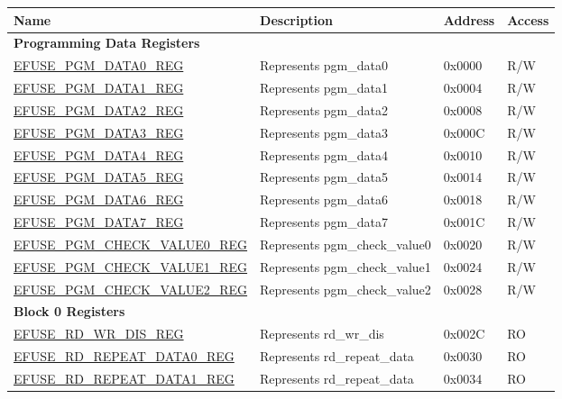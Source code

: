 \begin{longtable}{ | p{7cm} | p{6cm} | p{1.2cm} | p{1.5cm} | }
\hline\rowcolor{lightgray}
Name & Description &  Address & Access \\ \hline
\endhead
\multicolumn{4}{|l|}{\textbf{Programming Data Registers}} \\ \hline
\hyperref[regdesc:EFUSEPGMDATANREG]{EFUSE\_PGM\_DATA0\_REG} & Represents pgm\_data0 & 0x0000 & R/W \\ \hline
\hyperref[regdesc:EFUSEPGMDATANREG]{EFUSE\_PGM\_DATA1\_REG} & Represents pgm\_data1 & 0x0004 & R/W \\ \hline
\hyperref[regdesc:EFUSEPGMDATANREG]{EFUSE\_PGM\_DATA2\_REG} & Represents pgm\_data2 & 0x0008 & R/W \\ \hline
\hyperref[regdesc:EFUSEPGMDATANREG]{EFUSE\_PGM\_DATA3\_REG} & Represents pgm\_data3 & 0x000C & R/W \\ \hline
\hyperref[regdesc:EFUSEPGMDATANREG]{EFUSE\_PGM\_DATA4\_REG} & Represents pgm\_data4 & 0x0010 & R/W \\ \hline
\hyperref[regdesc:EFUSEPGMDATANREG]{EFUSE\_PGM\_DATA5\_REG} & Represents pgm\_data5 & 0x0014 & R/W \\ \hline
\hyperref[regdesc:EFUSEPGMDATANREG]{EFUSE\_PGM\_DATA6\_REG} & Represents pgm\_data6 & 0x0018 & R/W \\ \hline
\hyperref[regdesc:EFUSEPGMDATANREG]{EFUSE\_PGM\_DATA7\_REG} & Represents pgm\_data7 & 0x001C & R/W \\ \hline
\hyperref[regdesc:EFUSEPGMCHECKVALUENREG]{EFUSE\_PGM\_CHECK\_VALUE0\_REG} & Represents pgm\_check\_value0 & 0x0020 & R/W \\ \hline
\hyperref[regdesc:EFUSEPGMCHECKVALUENREG]{EFUSE\_PGM\_CHECK\_VALUE1\_REG} & Represents pgm\_check\_value1 & 0x0024 & R/W \\ \hline
\hyperref[regdesc:EFUSEPGMCHECKVALUENREG]{EFUSE\_PGM\_CHECK\_VALUE2\_REG} & Represents pgm\_check\_value2 & 0x0028 & R/W \\ \hline
\multicolumn{4}{|l|}{\textbf{Block 0 Registers}} \\ \hline
\hyperref[regdesc:EFUSERDWRDISREG]{EFUSE\_RD\_WR\_DIS\_REG} & Represents rd\_wr\_dis & 0x002C & RO \\ \hline
\hyperref[regdesc:EFUSERDREPEATDATA0REG]{EFUSE\_RD\_REPEAT\_DATA0\_REG} & Represents rd\_repeat\_data & 0x0030 & RO \\ \hline
\hyperref[regdesc:EFUSERDREPEATDATA1REG]{EFUSE\_RD\_REPEAT\_DATA1\_REG} & Represents rd\_repeat\_data & 0x0034 & RO \\ \hline

\end{longtable}
